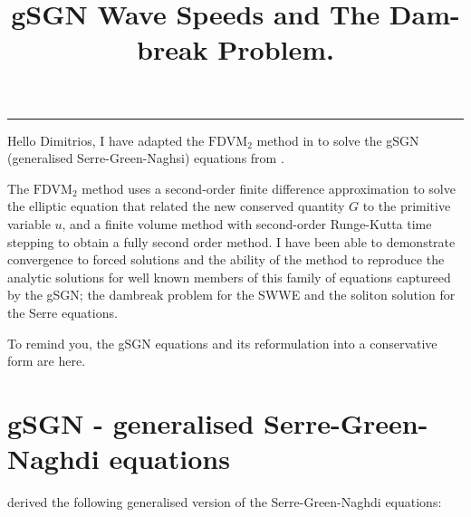 \documentclass[10pt]{article}
\title{gSGN Wave Speeds and The Dam-break Problem.}
\begin{document}
\maketitle

\vspace{-0.3in}
\noindent
\rule{\linewidth}{0.4pt}

Hello Dimitrios, I have adapted the $\text{FDVM}_2$ method in \cite{Zoppou-etal-2017} to solve the gSGN (generalised Serre-Green-Naghsi) equations from \cite{Clamond-Dutykh-2018-237}. 

The $\text{FDVM}_2$ method uses a second-order finite difference approximation to solve the elliptic equation that related the new conserved quantity $G$ to the primitive variable $u$, and a finite volume method with second-order Runge-Kutta time stepping to obtain a fully second order method. I have been able to demonstrate convergence to forced solutions and the ability of the method to reproduce the analytic solutions for well known members of this family of equations captureed by the gSGN; the dambreak problem for the SWWE and the soliton solution for the Serre equations.

To remind you, the gSGN equations and its reformulation into a conservative form are here.

\section{gSGN - generalised Serre-Green-Naghdi equations}
\cite{Clamond-Dutykh-2018-237} derived the following generalised version of the Serre-Green-Naghdi equations:
\end{document}
